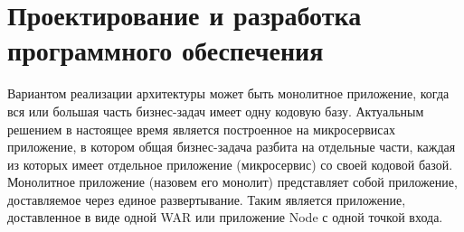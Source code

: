 \section{Проектирование и разработка программного обеспечения}

Вариантом реализации архитектуры может быть монолитное приложение, когда вся или большая часть бизнес-задач имеет одну кодовую базу.
Актуальным решением в настоящее время является построенное на микросервисах приложение, в котором общая бизнес-задача разбита на отдельные части, каждая из которых имеет отдельное приложение (микросервис) со своей кодовой базой.
\bigbreak
Монолитное приложение (назовем его монолит) представляет собой приложение, доставляемое через единое развертывание.
Таким является приложение, доставленное в виде одной WAR или приложение Node с одной точкой входа.

